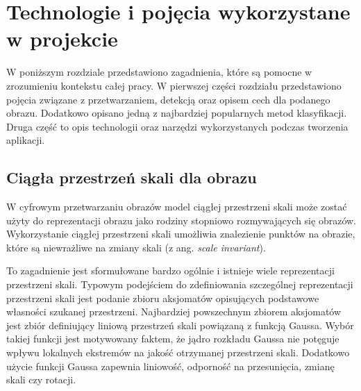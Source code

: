 \chapter{Technologie i pojęcia wykorzystane w projekcie}
\label{cha:Technologie}
W poniższym rozdziale przedstawiono zagadnienia, które są pomocne w zrozumieniu kontekstu całej pracy. W pierwszej części rozdziału przedstawiono pojęcia związane z przetwarzaniem, detekcją oraz opisem cech dla podanego obrazu. Dodatkowo opisano jedną z najbardziej popularnych metod klasyfikacji. Druga część to opis technologii oraz narzędzi wykorzystanych podczas tworzenia aplikacji.

\section{Ciągła przestrzeń skali dla obrazu}
\label{sec:StateSpace}
W cyfrowym przetwarzaniu obrazów model ciągłej przestrzeni skali może zostać użyty do reprezentacji obrazu jako rodziny stopniowo rozmywających się obrazów. Wykorzystanie ciągłej przestrzeni skali umożliwia znalezienie punktów na obrazie, które są niewrażliwe na zmiany skali (z ang. \textit{scale invariant}).


To zagadnienie jest sformułowane bardzo ogólnie i istnieje wiele reprezentacji przestrzeni skali. Typowym podejściem do zdefiniowania szczególnej reprezentacji przestrzeni skali jest podanie zbioru aksjomatów opisujących podstawowe własności szukanej przestrzeni. Najbardziej powszechnym zbiorem aksjomatów jest zbiór definiujący liniową przestrzeń skali powiązaną z funkcją Gaussa. Wybór takiej funkcji jest motywowany faktem, że jądro rozkładu Gaussa nie potęguje wpływu lokalnych ekstremów na jakość otrzymanej przestrzeni skali. Dodatkowo użycie funkcji Gaussa zapewnia liniowość, odporność na przesunięcia, zmianę skali czy rotacji.

